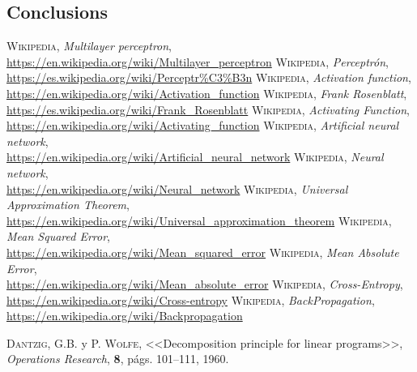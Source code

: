 \documentclass[a4paper, 11pt]{article}
\begin{document}
\subsection{Conclusions}



\newpage
\begin{thebibliography}{X}
 \textsc{Wikipedia},
\textit{Multilayer perceptron},\\ \url{https://en.wikipedia.org/wiki/Multilayer_perceptron}
 \textsc{Wikipedia},
\textit{Perceptrón},\\ \url{https://es.wikipedia.org/wiki/Perceptr%C3%B3n}
 \textsc{Wikipedia},
\textit{Activation function},\\ \url{https://en.wikipedia.org/wiki/Activation_function}
 \textsc{Wikipedia},
\textit{Frank Rosenblatt},\\ \url{https://es.wikipedia.org/wiki/Frank_Rosenblatt}
 \textsc{Wikipedia},
\textit{Activating Function},\\ \url{https://en.wikipedia.org/wiki/Activating_function}
 \textsc{Wikipedia},
\textit{Artificial neural network},\\ \url{https://en.wikipedia.org/wiki/Artificial_neural_network}
 \textsc{Wikipedia},
\textit{Neural network},\\ \url{https://en.wikipedia.org/wiki/Neural_network}
 \textsc{Wikipedia},
\textit{Universal Approximation Theorem},\\ \url{https://en.wikipedia.org/wiki/Universal_approximation_theorem}
 \textsc{Wikipedia},
\textit{Mean Squared Error},\\ \url{https://en.wikipedia.org/wiki/Mean_squared_error}
 \textsc{Wikipedia},
\textit{Mean Absolute Error},\\ \url{https://en.wikipedia.org/wiki/Mean_absolute_error}
 \textsc{Wikipedia},
\textit{Cross-Entropy},\\ \url{https://en.wikipedia.org/wiki/Cross-entropy}
 \textsc{Wikipedia},
\textit{BackPropagation},\\ \url{https://en.wikipedia.org/wiki/Backpropagation}

 \textsc{Dantzig, G.B.} y \textsc{P. Wolfe},
<<Decomposition principle for linear programs>>,
\textit{Operations Research}, \textbf{8}, págs. 101--111, 1960.

\end{thebibliography}
\end{document}
